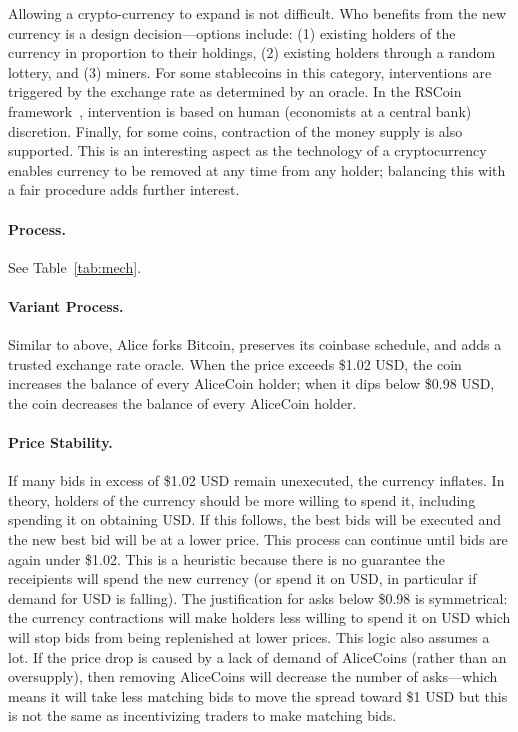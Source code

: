 Allowing a crypto-currency to expand is not difficult. Who benefits from the new currency is a design decision---options include: (1) existing holders of the currency in proportion to their holdings, (2) existing holders through a random lottery, and (3) miners. For some stablecoins in this category, interventions are triggered by the exchange rate as determined by an oracle. In the RSCoin framework~\cite{danezis2015centrally}, intervention is based on human  (\ie economists at a central bank) discretion. Finally, for some coins, contraction of the money supply is also supported. This is an interesting aspect as the technology of a cryptocurrency enables currency to be removed at any time from any holder; balancing this with a fair procedure adds further interest.

\paragraph{Process.} See Table~\ref{tab:mech}.

\paragraph{Variant Process.} Similar to above, Alice forks Bitcoin, preserves its coinbase schedule, and adds a trusted exchange rate oracle. When the price exceeds \$1.02 USD, the coin increases the balance of every AliceCoin holder; when it dips below \$0.98 USD, the coin decreases the balance of every AliceCoin holder.

\paragraph{Price Stability.} If many bids in excess of \$1.02 USD remain unexecuted, the currency inflates. In theory, holders of the currency should be more willing to spend it, including spending it on obtaining USD. If this follows, the best bids will be executed and the new best bid will be at a lower price. This process can continue until bids are again under \$1.02. This is a heuristic because there is no guarantee the receipients will spend the new currency (or spend it on USD, in particular if demand for USD is falling). The justification for asks below \$0.98 is symmetrical: the currency contractions will make holders less willing to spend it on USD which will stop bids from being replenished at lower prices. This logic also assumes a lot. If the price drop is caused by a lack of demand of AliceCoins (rather than an oversupply), then removing AliceCoins will decrease the number of asks---which means it will take less matching bids to move the spread toward \$1 USD but this is not the same as incentivizing traders to make matching bids. 

